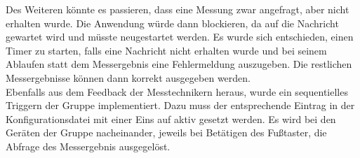 Des Weiteren könnte es passieren, dass eine Messung zwar angefragt, aber nicht erhalten wurde. Die Anwendung würde dann blockieren, da auf die Nachricht gewartet wird und müsste neugestartet werden. Es wurde sich entschieden, einen Timer zu starten, falls eine Nachricht nicht erhalten wurde und bei seinem Ablaufen statt dem Messergebnis eine Fehlermeldung auszugeben. Die restlichen Messergebnisse können dann korrekt ausgegeben werden.\\
Ebenfalls aus dem Feedback der Messtechnikern heraus, wurde ein sequentielles Triggern der Gruppe implementiert. Dazu muss der entsprechende Eintrag in der Konfigurationsdatei mit einer Eins auf aktiv gesetzt werden. Es wird bei den Geräten der Gruppe nacheinander, jeweils bei Betätigen des Fußtaster, die Abfrage des Messergebnis ausgegelöst.